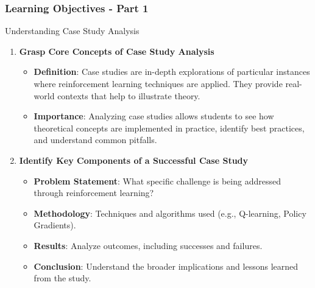 \documentclass[aspectratio=169]{beamer}
\begin{document}
\begin{frame}[fragile]
    \frametitle{Learning Objectives - Part 1}
    \begin{block}{Understanding Case Study Analysis}
        \begin{enumerate}
            \item \textbf{Grasp Core Concepts of Case Study Analysis}
                \begin{itemize}
                    \item \textbf{Definition}: Case studies are in-depth explorations of particular instances where reinforcement learning techniques are applied. They provide real-world contexts that help to illustrate theory.
                    \item \textbf{Importance}: Analyzing case studies allows students to see how theoretical concepts are implemented in practice, identify best practices, and understand common pitfalls.
                \end{itemize}

            \item \textbf{Identify Key Components of a Successful Case Study}
                \begin{itemize}
                    \item \textbf{Problem Statement}: What specific challenge is being addressed through reinforcement learning?
                    \item \textbf{Methodology}: Techniques and algorithms used (e.g., Q-learning, Policy Gradients).
                    \item \textbf{Results}: Analyze outcomes, including successes and failures.
                    \item \textbf{Conclusion}: Understand the broader implications and lessons learned from the study.
                \end{itemize}
        \end{enumerate}
    \end{block}
\end{frame}
\end{document}
